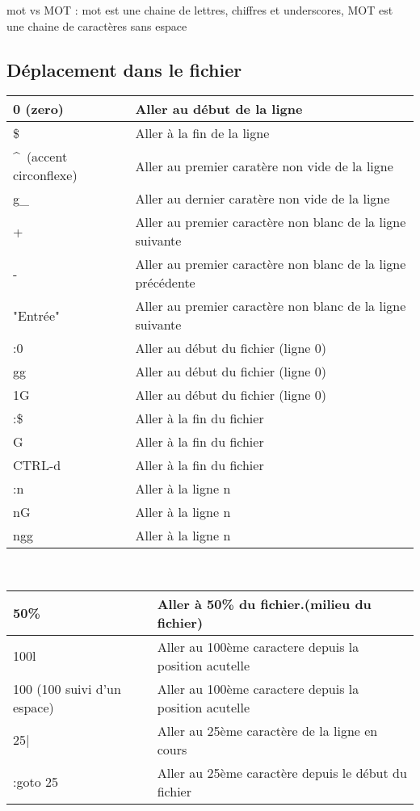 \documentclass{article}
\begin{document}
mot vs MOT : mot est une chaine de lettres, chiffres et underscores, MOT est une chaine de caractères sans espace\\

\subsection{Déplacement dans le fichier}
\begin{tabular}{|p{3cm}| l|  }
	\hline
	0 (zero) & Aller au début de la ligne \\ \hline
	\$ & Aller à la fin de la ligne \\ \hline
	\^~(accent circonflexe) & Aller au premier caratère non vide de la ligne \\ \hline
	g\_  & Aller au dernier  caratère non vide de la ligne \\ \hline
	+ & Aller au premier caractère non blanc de la ligne suivante \\ \hline
	- & Aller au premier caractère non blanc de la ligne précédente \\ \hline
	"Entrée" & Aller au premier caractère non blanc de la ligne suivante\\ \hline
	:0 & Aller au début du fichier (ligne 0) \\ \hline
	gg & Aller au début du fichier (ligne 0) \\ \hline
	1G & Aller au début du fichier (ligne 0) \\ \hline
	:\$ & Aller à la fin du fichier\\ \hline 
	G  & Aller à la fin du fichier\\ \hline
	CTRL-d & Aller à la fin du fichier\\ \hline
	:n  & Aller à la ligne n\\ \hline
	nG  & Aller à la ligne n\\ \hline
	ngg & Aller à la ligne n\\ \hline
\end{tabular}\\[0.5cm]



\begin{tabular}{|p{3cm}| l|  }
	\hline
  50\% & Aller à 50\% du fichier.(milieu du fichier) \\ \hline
  100l & Aller au 100ème caractere depuis la position acutelle \\ \hline
  100  (100 suivi d'un espace) & Aller au 100ème caractere depuis la position acutelle \\ \hline
  25| & Aller au 25ème caractère de la ligne en cours\\ \hline
  :goto 25 & Aller au 25ème caractère depuis le début du fichier\\ \hline
\end{tabular}\\
\end{document}
